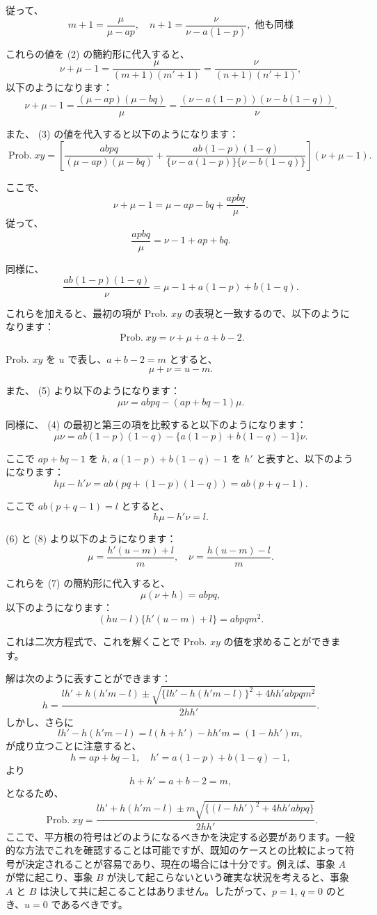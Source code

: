 \documentclass[a4paper,11pt,openany]{ltjsbook}
\begin{document}
従って、
\[
m + 1 = \frac{\mu}{\mu - ap}, \quad n + 1 = \frac{\nu}{\nu - a(1 - p)}, \text{ 他も同様}
\]

これらの値を (2) の簡約形に代入すると、
\[
\nu + \mu - 1 = \frac{\mu}{(m + 1)(m' + 1)} = \frac{\nu}{(n + 1)(n' + 1)},
\]
以下のようになります：
\[
\nu + \mu - 1 = \frac{(\mu - ap)(\mu - bq)}{\mu} = \frac{(\nu - a(1 - p))(\nu - b(1 - q))}{\nu}.
\]

また、 (3) の値を代入すると以下のようになります：
\[
\operatorname{Prob. } xy = \left[ \frac{abpq}{(\mu - ap)(\mu - bq)} + \frac{ab(1 - p)(1 - q)}{\{\nu - a(1 - p)\} \{\nu - b(1 - q)\}} \right] (\nu + \mu - 1).
\]

ここで、
\[
\nu + \mu - 1 = \mu - ap - bq + \frac{apbq}{\mu}.
\]
従って、
\[
\frac{apbq}{\mu} = \nu - 1 + ap + bq.
\]

同様に、
\[
\frac{ab(1 - p)(1 - q)}{\nu} = \mu - 1 + a(1 - p) + b(1 - q).
\]

これらを加えると、最初の項が Prob. \( xy \) の表現と一致するので、以下のようになります：
\[
\operatorname{Prob. } xy = \nu + \mu + a + b - 2.
\]

Prob. \( xy \) を \( u \) で表し、\( a + b - 2 = m \) とすると、
\[
\mu + \nu = u - m.
\]

また、 (5) より以下のようになります：
\[
\mu \nu = abpq - (ap + bq - 1)\mu.
\]

同様に、 (4) の最初と第三の項を比較すると以下のようになります：
\[
\mu \nu = ab(1 - p)(1 - q) - \{a(1 - p) + b(1 - q) - 1\}\nu.
\]

ここで \( ap + bq - 1 \) を \( h \), \( a(1 - p) + b(1 - q) - 1 \) を \( h' \) と表すと、以下のようになります：
\[
h \mu - h' \nu = ab(pq + (1 - p)(1 - q)) = ab(p + q - 1).
\]

ここで \( ab(p + q - 1) = l \) とすると、
\[
h \mu - h' \nu = l.
\]

(6) と (8) より以下のようになります：
\[
\mu = \frac{h'(u - m) + l}{m}, \quad \nu = \frac{h(u - m) - l}{m}.
\]

これらを (7) の簡約形に代入すると、
\[
\mu(\nu + h) = abpq,
\]
以下のようになります：
\[
(hu - l)\{h'(u - m) + l\} = abpqm^2.
\]

これは二次方程式で、これを解くことで Prob. \( xy \) の値を求めることができます。

解は次のように表すことができます：
\[
h = \frac{lh' + h(h'm - l) \pm \sqrt{\{lh' - h(h'm - l)\}^2 + 4hh'abpqm^2}}{2hh'}.
\]
しかし、さらに
\[
lh' - h(h'm - l) = l(h + h') - hh'm = (1 - hh')m,
\]
が成り立つことに注意すると、
\[
h = ap + bq - 1, \quad h' = a(1 - p) + b(1 - q) - 1,
\]
より
\[
h + h' = a + b - 2 = m,
\]
となるため、
\[
\operatorname{Prob.} xy = \frac{lh' + h(h'm - l) \pm m \sqrt{\{(l - hh')^2 + 4hh'abpq\}}}{2hh'}.
\]
ここで、平方根の符号はどのようになるべきかを決定する必要があります。一般的な方法でこれを確認することは可能ですが、既知のケースとの比較によって符号が決定されることが容易であり、現在の場合には十分です。例えば、事象 $A$ が常に起こり、事象 $B$ が決して起こらないという確実な状況を考えると、事象 $A$ と $B$ は決して共に起こることはありません。したがって、$p = 1$, $q = 0$ のとき、$u = 0$ であるべきです。
\end{document}
